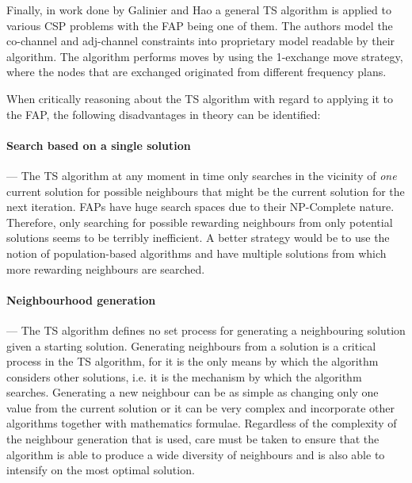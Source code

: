 Finally, in work done by Galinier and Hao\cite{TSCSP} a general TS algorithm is applied to various CSP problems with the FAP being one of them. The authors model the co-channel and adj-channel constraints into proprietary model readable by their algorithm. The algorithm performs moves by using the 1-exchange move strategy, where the nodes that are exchanged originated from different frequency plans\cite{TSCSP}.

When critically reasoning about the \gls{TS} algorithm with regard to applying it to the \gls{FAP}, the following disadvantages in theory can be identified:
\paragraph{Search based on a single solution}
--- The \gls{TS} algorithm at any moment in time only searches in the vicinity of \emph{one} current solution for possible neighbours that might be the current solution for the next iteration. \gls{FAP}s have huge search spaces due to their NP-Complete nature. Therefore, only searching for possible rewarding neighbours from only potential solutions seems to be terribly inefficient. A better strategy would be to use the notion of population-based algorithms and have multiple solutions from which more rewarding neighbours are searched.
\paragraph{Neighbourhood generation}
--- The \gls{TS} algorithm defines no set process for generating a neighbouring solution given a starting solution. Generating neighbours from a solution is a critical process in the \gls{TS} algorithm, for it is the only means by which the algorithm considers other solutions, i.e. it is the mechanism by which the algorithm searches. Generating a new neighbour can be as simple as changing only one value from the current solution or it can be very complex and incorporate other algorithms together with mathematics formulae. Regardless of the complexity of the neighbour generation that is used, care must be taken to ensure that the algorithm is able to produce a wide diversity of neighbours and is also able to intensify on the most optimal solution.
